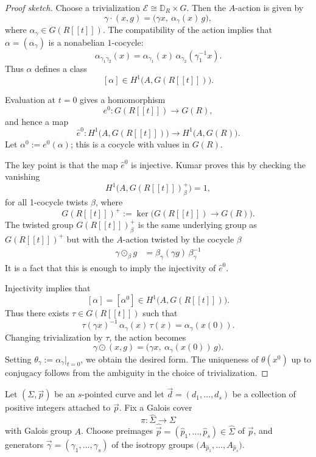\documentclass[12pt]{article}
\begin{document}
\begin{proof}[Proof sketch]
Choose a trivialization \(\mathcal E \cong \mathbb D_R \times G\). Then the
\(A\)-action is given by
\[
\gamma \cdot (x,g)
=
\bigl(\gamma x,\ \alpha_\gamma(x)\, g\bigr),
\]
where \(\alpha_\gamma \in G(R[[t]])\). The compatibility of the action implies
that \(\alpha = (\alpha_\gamma)\) is a nonabelian \(1\)-cocycle:
\[
\alpha_{\gamma_1\gamma_2}(x)
=
\alpha_{\gamma_1}(x)\,\alpha_{\gamma_2}(\gamma_1^{-1}x).
\]
Thus \(\alpha\) defines a class
\[
[\alpha] \in H^1\bigl(A, G(R[[t]])\bigr).
\]

Evaluation at \(t=0\) gives a homomorphism
\[
e^0 : G(R[[t]]) \to G(R),
\]
and hence a map
\[
\hat e^0 : H^1\bigl(A, G(R[[t]])\bigr) \to H^1\bigl(A, G(R)\bigr).
\]
Let \(\alpha^0 := e^0(\alpha)\); this is a cocycle with values in \(G(R)\).

The key point is that the map \(\hat e^0\) is injective.
Kumar proves this by checking the vanishing
\[
H^1\bigl(A, G(R[[t]])^+_\beta\bigr) = 1,
\]
for all 1-cocycle twists \(\beta\), where
\[
G(R[[t]])^+ := \ker\bigl(G(R[[t]]) \to G(R)\bigr).
\]
The twisted group \(G(R[[t]])^+_\beta\) is the same underlying group as \(G(R[[t]])^+\) but with the \(A\)-action twisted by the cocycle \(\beta\) \begin{align*}
\gamma \odot_\beta g
&=
\beta_\gamma(\gamma g)\,\beta_\gamma^{-1}
\end{align*} It is a fact that this is enough to imply the injectivity of \(\hat e^0\).

Injectivity implies that
\[
[\alpha] = [\alpha^0] \in H^1\bigl(A, G(R[[t]])\bigr).
\]
Thus there exists \(\tau \in G(R[[t]])\) such that
\[
\tau(\gamma x)^{-1}\,\alpha_\gamma(x)\,\tau(x)
=
\alpha_\gamma(x(0)).
\]
Changing trivialization by \(\tau\), the action becomes
\[
\gamma \odot (x,g)
=
\bigl(\gamma x,\ \alpha_\gamma(x(0))\, g\bigr).
\]
Setting \(\theta_\gamma := \alpha_\gamma|_{t=0}\), we obtain the desired form.
The uniqueness of \(\theta(x^0)\) up to conjugacy follows from the ambiguity in
the choice of trivialization.
\end{proof}

Let \((\Sigma,\vec p)\) be an \(s\)-pointed curve and let
\(\vec d=(d_1,\dots,d_s)\) be a collection of positive integers attached to \(\vec p\).
Fix a Galois cover
\[
\pi:\widehat\Sigma \to \Sigma
\]
with Galois group \(A\). Choose preimages
$
\widehat{\vec p}=(\widehat p_1,\dots,\widehat p_s)\in \widehat\Sigma$
of \(\vec p\), and generators
$
\vec\gamma=(\gamma_1,\dots,\gamma_s)
$
of the isotropy groups \(\bigl(A_{\widehat p_1},\dots,A_{\widehat p_s}\bigr)\).
\end{document}
